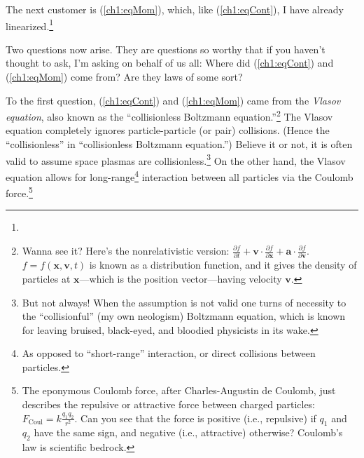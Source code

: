 The next customer is (\ref{ch1:eqMom}), which, like (\ref{ch1:eqCont}), I have
already linearized.\footnote{}


Two questions now arise. They are questions so worthy that if you haven't
thought to ask, I'm asking on behalf of us all: Where did (\ref{ch1:eqCont}) and
(\ref{ch1:eqMom}) come from? Are they laws of some sort? 

To the first question, (\ref{ch1:eqCont}) and (\ref{ch1:eqMom}) came from the
\emph{Vlasov equation}, also known as the ``collisionless Boltzmann
equation.''\footnote{Wanna see it?  Here's the nonrelativistic version:
  $\frac{\partial f}{\partial t} + \mathbf{v} \cdot \frac{\partial f}{\partial
    \mathbf{x}} + \mathbf{a} \cdot \frac{\partial f}{\partial \mathbf{v}}$.
  $f = f (\mathbf{x}, \mathbf{v}, t)$ is known as a distribution function, and
  it gives the density of particles at $\mathbf{x}$---which is the position
  vector---having velocity $\mathbf{v}$.} The Vlasov equation completely ignores
particle-particle (or pair) collisions. (Hence the ``collisionless'' in
``collisionless Boltzmann equation.'') Believe it or not, it is often valid to
assume space plasmas are collisionless.\footnote{But not always!  When the
  assumption is not valid one turns of necessity to the ``collisionful'' (my own
  neologism) Boltzmann equation, which is known for leaving bruised, black-eyed,
  and bloodied physicists in its wake.} On the other hand, the Vlasov equation
allows for long-range\footnote{As opposed to ``short-range'' interaction, or
  direct collisions between particles.}  interaction between all particles via
the Coulomb force.\footnote{The eponymous Coulomb force, after Charles-Augustin
  de Coulomb, just describes the repulsive or attractive force between charged
  particles: $F_{\textrm{Coul}} = k \frac{q_1 q_2}{r^2}$. Can you see that the
  force is positive (i.e., repulsive) if $q_1$ and $q_2$ have the same sign, and
  negative (i.e., attractive) otherwise? Coulomb's law is scientific bedrock.}

